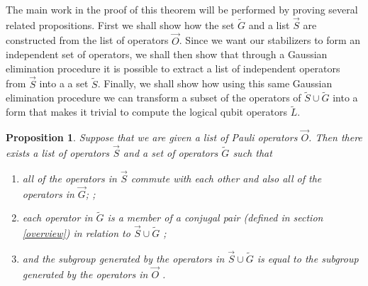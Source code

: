 \documentclass[twocolumn,showpacs,preprintnumbers,amsmath,amssymb,nofootinbib,pra,floatfix]{revtex4}
\newtheorem{proposition}{Proposition}
\newenvironment{remark}[1][Remark]{\begin{trivlist}
\item[\hskip \labelsep {\bfseries #1}]}{\end{trivlist}}
\newcommand{\lst}{\vec}
\newcommand{\set}{\tilde}
\begin{document}
\begin{remark}
The main work in the proof of this theorem will be performed by proving several related propositions.  First we shall show how the set $\set G$ and a list $\lst S$ are constructed from the list of operators $\lst O$.  Since we want our stabilizers to form an independent set of operators, we shall then show that through a Gaussian elimination procedure it is possible to extract a list of independent operators from $\lst S$ into a a set $\set S$.  Finally, we shall show how using this same Gaussian elimination procedure we can transform a subset of the operators of $\set S\cup\set G$ into a form that makes it trivial to compute the logical qubit operators $\set L$.
\end{remark}
\begin{proposition} \label{proposition-SG} Suppose that we are given a list of Pauli operators $\lst O$.  Then there exists a list of operators $\lst S$ and a set of operators $\set G$ such that
\begin{enumerate}
\item all of the operators in $\lst S$ commute with each other and also all of the operators in $\lst G$; \label{stabs-commute-with-G};
\item each operator in $\set G$ is a member of a \emph{conjugal pair} (defined in section \ref{overview}) in relation to $\lst S \cup \set G $ \label{conjugal-pairs-commute-with-SAG};
\item and the subgroup generated by the operators in $\lst S\cup \set G$ is equal to the subgroup generated by the operators in $\lst O$ \label{SAG-spans-all}.
\end{enumerate}
\end{proposition}
\end{document}
